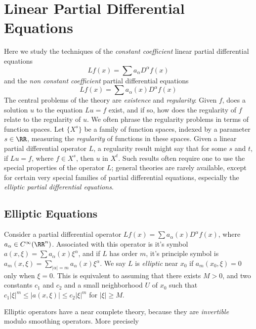 \part{Linear Partial Differential Equations}

Here we study the techniques of the \emph{constant coefficient} linear partial differential equations
%
\[ Lf(x) = \sum a_\alpha D^\alpha f(x) \]
%
and the \emph{non constant coefficient} partial differential equations
%
\[ Lf(x) = \sum a_\alpha(x) D^\alpha f(x) \]
%
The central problems of the theory are \emph{existence} and \emph{regularity}: Given $f$, does a solution $u$ to the equation $Lu = f$ exist, and if so, how does the regularity of $f$ relate to the regularity of $u$. We often phrase the regularity problems in terms of function spaces. Let $\{ X^s \}$ be a family of function spaces, indexed by a parameter $s \in \RR$, measuring the \emph{regularity} of functions in these spaces. Given a linear partial differential operator $L$, a regularity result might say that for some $s$ and $t$, if $Lu = f$, where $f \in X^s$, then $u$ in $X^t$. Such results often require one to use the special properties of the operator $L$; general theories are rarely available, except for certain very special families of partial differential equations, especially the \emph{elliptic partial differential equations}.

\chapter{Elliptic Equations}

Consider a partial differential operator $L f(x) = \sum a_\alpha(x) D^\alpha f(x)$, where $a_\alpha \in C^\infty(\RR^n)$. Associated with this operator is it's symbol $a(x,\xi) = \sum a_\alpha(x) \xi^\alpha$, and if $L$ has order $m$, it's principle symbol is $a_m(x,\xi) = \sum_{|\alpha| = m} a_\alpha(x) \xi^\alpha$. We say $L$ is \emph{elliptic} near $x_0$ if $a_m(x_0,\xi) = 0$ only when $\xi = 0$. This is equivalent to assuming that there exists $M > 0$, and two constants $c_1$ and $c_2$ and a small neighborhood $U$ of $x_0$ such that $c_1 |\xi|^m \leq |a(x,\xi)| \leq c_2 |\xi|^m$ for $|\xi| \geq M$.

Elliptic operators have a near complete theory, because they are \emph{invertible} modulo smoothing operators. More precisely

